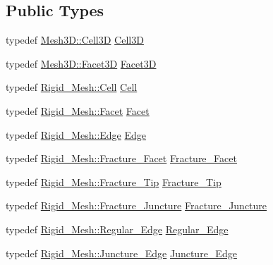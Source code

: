 \subsection*{Public Types}
\begin{DoxyCompactItemize}
\item 
typedef \hyperlink{classFVCode3D_1_1Mesh3D_1_1Cell3D}{Mesh3\+D\+::\+Cell3D} \hyperlink{classFVCode3D_1_1Exporter_a3f305f09b65232ef0d2673269f2144a1}{Cell3D}
\item 
typedef \hyperlink{classFVCode3D_1_1Mesh3D_1_1Facet3D}{Mesh3\+D\+::\+Facet3D} \hyperlink{classFVCode3D_1_1Exporter_ad902e2a70d9756f7698c47c3be815df0}{Facet3D}
\item 
typedef \hyperlink{classFVCode3D_1_1Rigid__Mesh_1_1Cell}{Rigid\+\_\+\+Mesh\+::\+Cell} \hyperlink{classFVCode3D_1_1Exporter_a47324b87e220f070d8474100d0d01b84}{Cell}
\item 
typedef \hyperlink{classFVCode3D_1_1Rigid__Mesh_1_1Facet}{Rigid\+\_\+\+Mesh\+::\+Facet} \hyperlink{classFVCode3D_1_1Exporter_a759e8978d901cd0901471438ec73a778}{Facet}
\item 
typedef \hyperlink{classFVCode3D_1_1Rigid__Mesh_1_1Edge}{Rigid\+\_\+\+Mesh\+::\+Edge} \hyperlink{classFVCode3D_1_1Exporter_a354e98139cc766ef0da8ffd5b2196f5b}{Edge}
\item 
typedef \hyperlink{classFVCode3D_1_1Rigid__Mesh_1_1Fracture__Facet}{Rigid\+\_\+\+Mesh\+::\+Fracture\+\_\+\+Facet} \hyperlink{classFVCode3D_1_1Exporter_ad213c5ad78040015b3e6dfb11fe015fe}{Fracture\+\_\+\+Facet}
\item 
typedef \hyperlink{classFVCode3D_1_1Rigid__Mesh_a114241afca8d7f22e28397e6a59c931f}{Rigid\+\_\+\+Mesh\+::\+Fracture\+\_\+\+Tip} \hyperlink{classFVCode3D_1_1Exporter_a0b32ca80de98d8d633485ef5c0f537bb}{Fracture\+\_\+\+Tip}
\item 
typedef \hyperlink{classFVCode3D_1_1Rigid__Mesh_a7c7beee55763889ef7a4d0bc48392084}{Rigid\+\_\+\+Mesh\+::\+Fracture\+\_\+\+Juncture} \hyperlink{classFVCode3D_1_1Exporter_a30344139bcff116e4b2b34dd829bac98}{Fracture\+\_\+\+Juncture}
\item 
typedef \hyperlink{classFVCode3D_1_1Rigid__Mesh_1_1Regular__Edge}{Rigid\+\_\+\+Mesh\+::\+Regular\+\_\+\+Edge} \hyperlink{classFVCode3D_1_1Exporter_ad9b3eac14c24ce86bb99b662dcff288e}{Regular\+\_\+\+Edge}
\item 
typedef \hyperlink{classFVCode3D_1_1Rigid__Mesh_1_1Juncture__Edge}{Rigid\+\_\+\+Mesh\+::\+Juncture\+\_\+\+Edge} \hyperlink{classFVCode3D_1_1Exporter_adae7aeb832ef13bceb9cd00987ac63d1}{Juncture\+\_\+\+Edge}

\end{DoxyCompactItemize}
